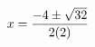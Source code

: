 \documentclass[preview]{standalone}
\begin{document}
\begin{align*}
\special{dvisvgm:raw <g id='unique000'>}x=\frac{-4\pm\sqrt{32}}{2(2)}\special{dvisvgm:raw </g>}
\end{align*}
\end{document}
